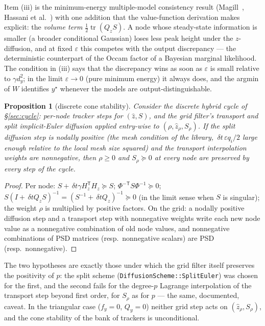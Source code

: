 \documentclass[11pt,a4paper]{article}
\newcommand{\tr}{\operatorname{tr}}
\newcommand{\T}{^{\mathsf T}}
\newcommand{\zh}{\hat{z}}
\newcommand{\zr}{\hat{z}_{\rho}}   %
\newcommand{\Sr}{S_{\rho}}          %
\newcommand{\eps}{\varepsilon}
\newcommand{\dt}{\,\delta t}
\theoremstyle{plain}
\newtheorem{proposition}{Proposition}
\theoremstyle{definition}
\theoremstyle{remark}
\begin{document}
Item (iii) is the minimum-energy multiple-model consistency result (Magill~\cite{Magill1965}, Hassani et al.~\cite{Hassani2009}) with one addition that the value-function derivation makes explicit: the \emph{volume term} $\tfrac12\tr(Q_zS)$. A node whose steady-state information is smaller (a broader conditional Gaussian) loses less peak height under the $z$-diffusion, and at fixed $\eps$ this competes with the output discrepancy --- the deterministic counterpart of the Occam factor of a Bayesian marginal likelihood. The condition in (iii) says that the discrepancy wins as soon as $\eps$ is small relative to $\gamma d_y^2$; in the limit $\eps\to0$ (pure minimum energy) it always does, and the argmin of $W$ identifies $y^\star$ whenever the models are output-distinguishable.

\begin{proposition}[discrete cone stability]
Consider the discrete hybrid cycle of \S\ref{sec:cycle}: per-node tracker steps for $(\zh,S)$, and the grid filter's transport and split implicit-Euler diffusion applied entry-wise to $(\rho,\zr,\Sr)$. If the split diffusion step is nodally positive (the mesh condition of the library, $\dt\,\eps q_i/2$ large enough relative to the local mesh size squared) and the transport interpolation weights are nonnegative, then $\rho\ge0$ and $\Sr\succeq0$ at every node are preserved by every step of the cycle.
\end{proposition}
\begin{proof}
Per node: $S+\dt\gamma H_z\T H_z\succeq S$; $\Phi^{-\mathsf T}S\Phi^{-1}\succeq0$; $S(I+\dt Q_zS)^{-1} = (S^{-1}+\dt Q_z)^{-1}\succeq0$ (in the limit sense when $S$ is singular); the weight $\rho$ is multiplied by positive factors. On the grid: a nodally positive diffusion step and a transport step with nonnegative weights write each new node value as a nonnegative combination of old node values, and nonnegative combinations of PSD matrices (resp.\ nonnegative scalars) are PSD (resp.\ nonnegative).
\end{proof}
The two hypotheses are exactly those under which the grid filter itself preserves the positivity of $p$: the split scheme (\texttt{DiffusionScheme::SplitEuler}) was chosen for the first, and the second fails for the degree-$p$ Lagrange interpolation of the transport step beyond first order, for $\Sr$ as for $p$ --- the same, documented, caveat. In the triangular case ($f_y=0$, $Q_y=0$) neither grid step acts on $(\zr,\Sr)$, and the cone stability of the bank of trackers is unconditional.
\end{document}
